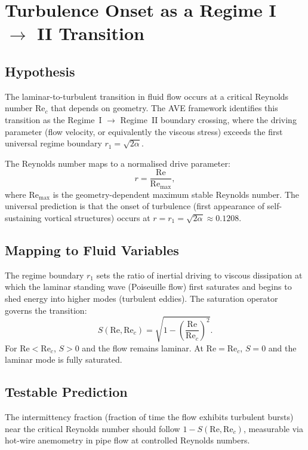 \section{Turbulence Onset as a Regime I \texorpdfstring{$\to$}{to} II Transition}
\label{sec:turbulence_onset}

\subsection{Hypothesis}

The laminar-to-turbulent transition in fluid flow occurs at a
critical Reynolds number $\mathrm{Re}_c$ that depends on geometry.
The AVE framework identifies this transition as the Regime~I $\to$
Regime~II boundary crossing, where the driving parameter (flow
velocity, or equivalently the viscous stress) exceeds the first
universal regime boundary $r_1 = \sqrt{2\alpha}$.

The Reynolds number maps to a normalised drive parameter:
\begin{equation}
  r = \frac{\mathrm{Re}}{\mathrm{Re}_{\max}},
\end{equation}
where $\mathrm{Re}_{\max}$ is the geometry-dependent maximum
stable Reynolds number.  The universal prediction is that the
onset of turbulence (first appearance of self-sustaining vortical
structures) occurs at $r = r_1 = \sqrt{2\alpha} \approx 0.1208$.

\subsection{Mapping to Fluid Variables}

The regime boundary $r_1$ sets the ratio of inertial driving to
viscous dissipation at which the laminar standing wave (Poiseuille
flow) first saturates and begins to shed energy into higher modes
(turbulent eddies).  The saturation operator governs the
transition:
\begin{equation}
  S(\mathrm{Re}, \mathrm{Re}_c)
  = \sqrt{1 - \left(\frac{\mathrm{Re}}{\mathrm{Re}_c}\right)^2}.
\end{equation}
For $\mathrm{Re} < \mathrm{Re}_c$, $S > 0$ and the flow remains
laminar.  At $\mathrm{Re} = \mathrm{Re}_c$, $S = 0$ and the
laminar mode is fully saturated.

\subsection{Testable Prediction}

The intermittency fraction (fraction of time the flow exhibits
turbulent bursts) near the critical Reynolds number should follow
$1 - S(\mathrm{Re}, \mathrm{Re}_c)$, measurable via hot-wire
anemometry in pipe flow at controlled Reynolds numbers.
